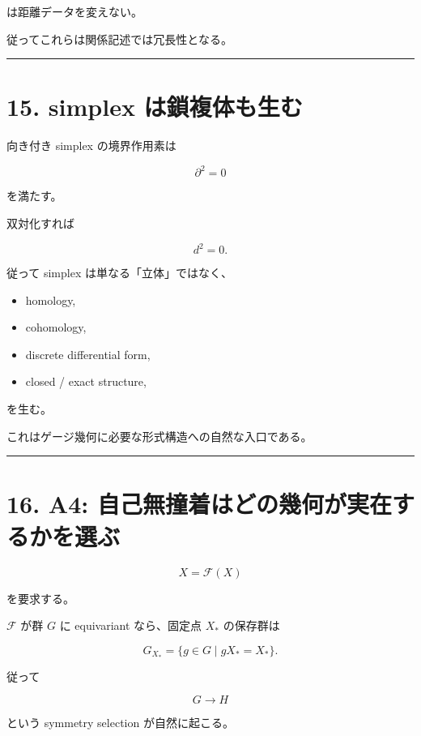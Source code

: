 \documentclass[
  a4paper,
]{ltjsarticle}
\providecommand{\tightlist}{%
  \setlength{\itemsep}{0pt}\setlength{\parskip}{0pt}}
\begin{document}
は距離データを変えない。

従ってこれらは関係記述では冗長性となる。

\begin{center}\rule{0.5\linewidth}{0.5pt}\end{center}

\section{15. simplex
は鎖複体も生む}\label{simplex-ux306fux9396ux8907ux4f53ux3082ux751fux3080}

向き付き simplex の境界作用素は

\[
\boxed{
\partial^2=0
}
\]

を満たす。

双対化すれば

\[
\boxed{
d^2=0
}.
\]

従って simplex は単なる「立体」ではなく、

\begin{itemize}
\tightlist
\item
  homology,
\item
  cohomology,
\item
  discrete differential form,
\item
  closed / exact structure,
\end{itemize}

を生む。

これはゲージ幾何に必要な形式構造への自然な入口である。

\begin{center}\rule{0.5\linewidth}{0.5pt}\end{center}

\section{16. A4:
自己無撞着はどの幾何が実在するかを選ぶ}\label{a4-ux81eaux5df1ux7121ux649eux7740ux306fux3069ux306eux5e7eux4f55ux304cux5b9fux5728ux3059ux308bux304bux3092ux9078ux3076}

\[
\boxed{
X=\mathcal F(X)
}
\]

を要求する。

\(\mathcal F\) が群 \(G\) に equivariant なら、固定点 \(X_*\) の保存群は

\[
\boxed{
G_{X_*}
=
\{g\in G\mid gX_*=X_*\}
}.
\]

従って

\[
\boxed{
G\to H
}
\]

という symmetry selection が自然に起こる。
\end{document}
